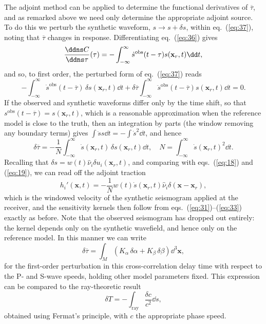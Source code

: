  The adjoint method can be applied to determine the functional derivatives of $\overline{\tau}$, and 
 as remarked above we need only determine the appropriate adjoint source. To do this we perturb the synthetic waveform, 
 $s\to s+\delta s$, within eq.~(\ref{eq:37}), noting that $\overline{\tau}$ changes in response. Differentiating 
 eq.~(\ref{eq:36}) gives
\begin{equation}
\frac{\ddns C}{\ddns\tau}(\tau)=-\int_{-\infty}^{\infty}\dot{s}^{\mathrm{obs}}(t-\tau)s(\mathbf{x}_{r},t)\dd t,
\label{eq:38}
\end{equation}
and so, to first order, the perturbed form of eq.~(\ref{eq:37}) reads
\begin{equation}
-\int_{-\infty}^{\infty}\dot{s}^{\mathrm{obs}}(t-\overline{\tau})\,\delta s(\mathbf{x}_{r},t)\dd t
+\delta\overline{\tau}\int_{-\infty}^{\infty}\ddot{s}^{\mathrm{obs}}(t-\overline{\tau})s(\mathbf{x}_{r},t)\dd t=0.
\label{eq:39}
\end{equation}
If the observed and synthetic waveforms differ only by the time shift, so that $s^{\mathrm{obs}}(t-\overline{\tau})=s(\mathbf{x}_{r},t)$, 
which is a reasonable approximation when the reference model is close to the truth, then an integration by parts (the 
window removing any boundary terms) gives $\int\ddot{s}s\dd t=-\int\dot{s}^{2}\dd t$, and hence
\begin{equation}
\delta\overline{\tau}=-\frac{1}{N}\int_{-\infty}^{\infty}\dot{s}(\mathbf{x}_{r},t)\,\delta s(\mathbf{x}_{r},t)\dd t,
\quad N=\int_{-\infty}^{\infty}\dot{s}(\mathbf{x}_{r},t)^{2}\dd t.
\label{eq:40}
\end{equation}
Recalling that $\delta s=w(t)\hat{\nu}_{i}\delta u_{i}(\mathbf{x}_{r},t)$, and comparing with eqs.~(\ref{eq:18}) and (\ref{eq:19}), 
we can read off the adjoint traction
\begin{equation}
h_{i}'(\mathbf{x},t)=-\frac{1}{N}w(t)\dot{s}(\mathbf{x}_{r},t)\hat{\nu}_{i}\delta(\mathbf{x}-\mathbf{x}_{r}),
\label{eq:41}
\end{equation}
which is the windowed velocity of the synthetic seismogram applied at the receiver, and the sensitivity kernels then follow 
from eqs.~(\ref{eq:31})--(\ref{eq:33}) exactly as before. Note that the observed seismogram has dropped out entirely: 
the kernel depends only on the synthetic wavefield, and hence only on the reference model. In this manner we can write
\begin{equation}
\delta\overline{\tau}=\int_{M}(K_{\alpha}\,\delta\alpha+K_{\beta}\,\delta\beta)\dd^{3}\mathbf{x},
\label{eq:42}
\end{equation}
for the first-order perturbation in this cross-correlation delay time with respect to the P- and S-wave speeds, 
holding other model parameters fixed. This expression can be compared to the ray-theoretic result
\begin{equation}
\delta T=-\int_{\mathrm{ray}}\frac{\delta c}{c^{2}}\dd s,
\label{eq:43}
\end{equation}
obtained using Fermat's principle, with $c$ the appropriate phase speed. 


